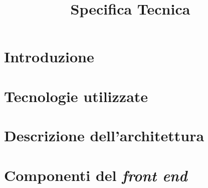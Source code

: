 


\author{\ALL}
\supervisor{\MM}
\dest{\ALL}
\title{Specifica Tecnica}

\newcommand{\nogloxy}[1]{#1}
\newcommand{\subsubsubsection}[1]{\paragraph{#1}}
\newcommand{\textt}[1]{\texttt{#1}}



\maketitle

\tableofcontents



\section{Introduzione}


\section{Tecnologie utilizzate}


\section{Descrizione dell'architettura}


\section{Componenti del \emph{front end}} \label{sec:frontend}


